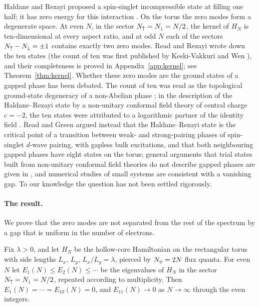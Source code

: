 Haldane and Rezayi \cite{HR88} proposed a spin-singlet incompressible state at filling one half; it has zero energy
for this interaction \cite{RR96,GFN97}. On the torus the zero modes form a degenerate space. At even $N$, in the
sector $N_{\uparrow}=N_{\downarrow}=N/2$, the kernel of $H_N$ is ten-dimensional at every aspect ratio, and at odd $N$ each
of the sectors $N_{\uparrow}-N_{\downarrow}=\pm1$ contains exactly two zero modes. Read and Rezayi \cite{RR96} wrote down the
ten states (the count of ten was first published by Keski-Vakkuri and Wen \cite{KVW93}), and their
completeness is proved in Appendix~\ref{app:kernel}; see Theorem~\ref{thm:kernel}. Whether these zero modes are the ground
states of a gapped phase has been debated. The count of ten was read as the topological ground-state
degeneracy of a non-Abelian phase \cite{KVW93,GFN97,Ino99}; in the description of the Haldane--Rezayi state
by a non-unitary conformal field theory of central charge $c=-2$, the ten states were attributed to a
logarithmic partner of the identity field \cite{GFN97}. Read and Green \cite{RG00} argued instead that the
Haldane--Rezayi state is the critical point of a transition between weak- and strong-pairing phases of
spin-singlet $d$-wave pairing, with gapless bulk excitations, and that both neighbouring gapped phases have
eight states on the torus; general arguments that trial states built from non-unitary conformal field
theories do not describe gapped phases are given in \cite{Rea09a,Rea09b}, and numerical studies of small
systems \cite{CRE19,NPBG23} are consistent with a vanishing gap. To our knowledge the question has not been
settled rigorously.

\paragraph{The result.}
We prove that the zero modes are not separated from the rest of the spectrum by a gap that is uniform in
the number of electrons.

\begin{theorem*}
Fix $\lambda>0$, and let $H_N$ be the hollow-core Hamiltonian on the rectangular torus with side lengths
$L_x$, $L_y$, $L_x/L_y=\lambda$, pierced by $N_{\phi}=2N$ flux quanta. For even $N$ let
$E_1(N)\le E_2(N)\le\cdots$ be the eigenvalues of $H_N$ in the sector $N_{\uparrow}=N_{\downarrow}=N/2$, repeated according to
multiplicity. Then $E_1(N)=\cdots=E_{10}(N)=0$, and $E_{11}(N)\to0$ as $N\to\infty$ through the even
integers.
\end{theorem*}

